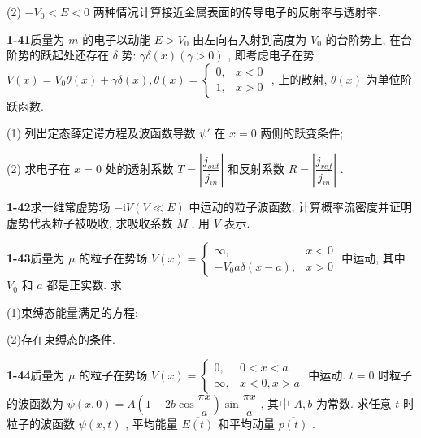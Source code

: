 (2) $\displaystyle -V_0 < E < 0$ 两种情况计算接近金属表面的传导电子的反射率与透射率.

\vfill

\newpage

\textbf{1-41}\quad 质量为 $\displaystyle m$ 的电子以动能 $\displaystyle E > V_{0}$ 由左向右入射到高度为 $\displaystyle V_{0}$ 的台阶势上, 在台阶势的跃起处还存在 $\displaystyle \delta$ 势: $\displaystyle \gamma \delta(x)(\gamma > 0)$ , 即考虑电子在势 $\displaystyle V(x) = V_{0} \theta(x) + \gamma \delta(x), \theta(x) = \begin{cases} 0, & x < 0 \\ 1, & x > 0 \end{cases}$ , 上的散射, $\displaystyle \theta(x)$ 为单位阶跃函数.

(1) 列出定态薛定谔方程及波函数导数 $\displaystyle \psi'$ 在 $\displaystyle x = 0$ 两侧的跃变条件;

(2) 求电子在 $\displaystyle x = 0$ 处的透射系数 $\displaystyle T = \left| \dfrac{j_{out}}{j_{in}} \right|$ 和反射系数 $\displaystyle R = \left| \dfrac{j_{ref}}{j_{in}} \right|$ .

\vfill

\newpage

\textbf{1-42}\quad 求一维常虚势场 $\displaystyle -\mathrm{i}V(V \ll E)$ 中运动的粒子波函数, 计算概率流密度并证明虚势代表粒子被吸收, 求吸收系数 $\displaystyle M$ , 用 $\displaystyle V$ 表示.

\vfill

\newpage

\textbf{1-43}\quad 质量为 $\displaystyle \mu$ 的粒子在势场 $\displaystyle V(x) = \begin{cases} \infty, & x < 0 \\ -V_0 a \delta (x - a), & x > 0 \end{cases}$ 中运动, 其中 $\displaystyle V_{0}$ 和 $\displaystyle a$ 都是正实数. 求

(1)束缚态能量满足的方程;

(2)存在束缚态的条件.

\vfill

\newpage

\textbf{1-44}\quad 质量为 $\displaystyle \mu$ 的粒子在势场 $\displaystyle V(x) = \begin{cases} 0, & 0 < x < a \\ \infty, & x < 0, x > a \end{cases}$ 中运动. $\displaystyle t = 0$ 时粒子的波函数为 $\displaystyle \psi(x,0) = A\left(1 + 2b\cos \dfrac{\pi x}{a}\right)\sin \dfrac{\pi x}{a}$ , 其中 $\displaystyle A, b$ 为常数. 求任意 $\displaystyle t$ 时粒子的波函数 $\displaystyle \psi(x,t)$ , 平均能量 $\displaystyle \overline{E(t)}$ 和平均动量 $\displaystyle \overline{p(t)}$ .

